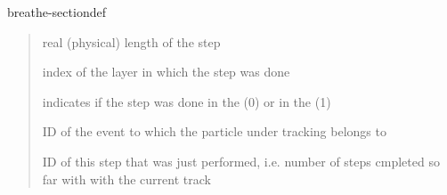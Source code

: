 \documentclass[letterpaper,10pt,english]{sphinxmanual}
\begin{document}
\begin{fulllineitems}
\begin{sphinxuseclass}{breathe-sectiondef}
\begin{fulllineitems}
\begin{quote}
\begin{description}
\sphinxAtStartPar
real (physical) length of the step 

\sphinxAtStartPar
index of the layer in which the step was done 

\sphinxAtStartPar
indicates if the step was done in the  (0) or in the  (1) 

\sphinxAtStartPar
ID of the event to which the particle under tracking belongs to 

\sphinxAtStartPar
ID of this step that was just performed, i.e. number of steps cmpleted so far with with the current track 

\end{description}\end{quote}


\end{fulllineitems}


\end{sphinxuseclass}
\end{fulllineitems}

\end{document}
